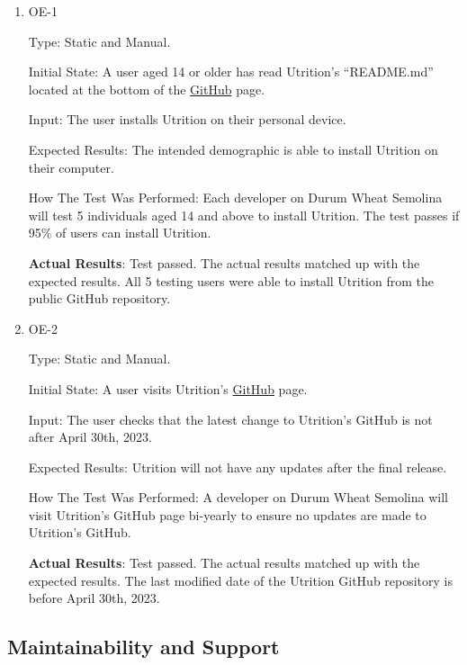 \documentclass[12pt, titlepage]{article}
\begin{document}
	\begin{enumerate}
		
		\item{OE-1} 
		
		Type: Static and Manual.
		
		Initial State: A user aged 14 or older has read Utrition’s “README.md” located at the bottom of the \href{https://github.com/jeff-rey-wang/utrition/}{GitHub} page.
		
		Input: The user installs Utrition on their personal device.
		
		Expected Results: The intended demographic is able to install Utrition on their computer.
		
		How The Test Was Performed: Each developer on Durum Wheat Semolina will test 5 individuals aged 14 and above to install Utrition. The test passes if 95\% of users can install Utrition.
		
		\textbf{Actual Results}: Test passed. The actual results matched up with the expected results. All 5 testing users were able to install Utrition from the public GitHub repository.
		
		\item{OE-2} 
		
		Type: Static and Manual.
		
		Initial State: A user visits Utrition’s \href{https://github.com/jeff-rey-wang/utrition/}{GitHub} page.
		
		Input: The user checks that the latest change to Utrition’s GitHub is not after April 30th, 2023.
		
		Expected Results: Utrition will not have any updates after the final release.
		
		How The Test Was Performed: A developer on Durum Wheat Semolina will visit Utrition’s GitHub page bi-yearly to ensure no updates are made to Utrition’s GitHub.
		
		\textbf{Actual Results}: Test passed. The actual results matched up with the expected results. The last modified date of the Utrition GitHub repository is before April 30th, 2023.
		
	\end{enumerate}
	
	\subsection{Maintainability and Support}
	
\end{document}
